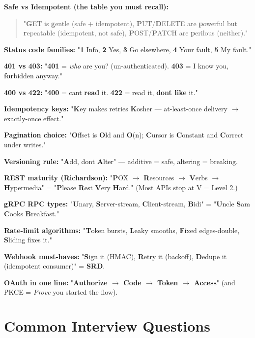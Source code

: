 \documentclass[11pt]{article}
\begin{document}
\textbf{Safe vs Idempotent (the table you must recall):}

\begin{quote}
"\textbf{G}ET is \textbf{g}entle (safe + idempotent), \textbf{P}UT/\textbf{D}ELETE are \textbf{p}owerful but \textbf{r}epeatable (idempotent, not safe), \textbf{P}OST/\textbf{P}ATCH are \textbf{p}erilous (neither)."
\end{quote}

\textbf{Status code families:} "\textbf{1} Info, \textbf{2} Yes, \textbf{3} Go elsewhere, \textbf{4} Your fault, \textbf{5} My fault."

\textbf{401 vs 403:} "\textbf{401} = \emph{who} are you? (un-authenticated). \textbf{403} = I know you, \textbf{for}bidden anyway."

\textbf{400 vs 422:} "\textbf{400} = can\textquotesingle t \textbf{read} it. \textbf{422} = read it, \textbf{don\textquotesingle t like} it."

\textbf{Idempotency keys:} "\textbf{K}ey makes retries \textbf{K}osher --- at-least-once delivery \(\rightarrow\) exactly-once effect."

\textbf{Pagination choice:} "\textbf{O}ffset is \textbf{O}ld and \textbf{O}(n); \textbf{C}ursor is \textbf{C}onstant and \textbf{C}orrect under writes."

\textbf{Versioning rule:} "\textbf{A}dd, don\textquotesingle t \textbf{A}lter" --- additive = safe, altering = breaking.

\textbf{REST maturity (Richardson):} "\textbf{P}OX \(\rightarrow\) \textbf{R}esources \(\rightarrow\) \textbf{V}erbs \(\rightarrow\) \textbf{H}ypermedia" = "\textbf{P}lease \textbf{R}est \textbf{V}ery \textbf{H}ard." (Most APIs stop at V = Level 2.)

\textbf{gRPC RPC types:} "\textbf{U}nary, \textbf{S}erver-stream, \textbf{C}lient-stream, \textbf{B}idi" = "\textbf{U}ncle \textbf{S}am \textbf{C}ooks \textbf{B}reakfast."

\textbf{Rate-limit algorithms:} "\textbf{T}oken bursts, \textbf{L}eaky smooths, \textbf{F}ixed edges-double, \textbf{S}liding fixes it."

\textbf{Webhook must-haves:} "\textbf{S}ign it (HMAC), \textbf{R}etry it (backoff), \textbf{D}edupe it (idempotent consumer)" = \textbf{SRD}.

\textbf{OAuth in one line:} "\textbf{Authorize \(\rightarrow\) Code \(\rightarrow\) Token \(\rightarrow\) Access}" (and PKCE = \emph{Prove} you started the flow).

\section{Common Interview Questions}\label{common-interview-questions}
\end{document}
